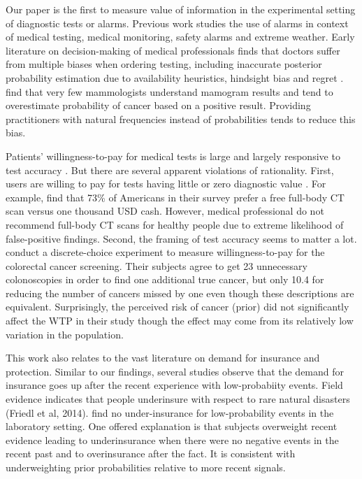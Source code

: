 \documentclass[12pt,a4paper]{article}
\begin{document}
Our paper is the first to measure value of information in the experimental setting of diagnostic tests or alarms. Previous work studies the use of alarms in context of medical testing, medical monitoring, safety alarms and extreme weather. Early literature on decision-making of medical professionals finds that doctors suffer from multiple biases when ordering testing, including  inaccurate posterior probability estimation due to availability heuristics, hindsight bias and regret \citep{bornstein_rationality_2001}. \citet{gigerenzer_helping_2007}find that very few mammologists understand mamogram results and tend to overestimate probability of cancer based on a positive result. Providing practitioners with natural frequencies instead of probabilities tends to reduce this bias.  

Patients' willingness-to-pay for medical tests is large and largely responsive to test accuracy \citep{liang_acceptability_2003, howard_does_2009, neumann_willingness--pay_2012}. But there are several apparent violations of rationality. First, users are willing to pay for tests having little or zero diagnostic value \citep{schwartz_enthusiasm_2004, neumann_willingness--pay_2012}. For example, \citet{schwartz_enthusiasm_2004} find that 73\% of Americans in their survey prefer a free full-body CT scan versus one thousand USD cash. However, medical professional do not recommend full-body CT scans for healthy people due to extreme likelihood of false-positive findings. Second, the framing of test accuracy seems to matter a lot. \citet{howard_does_2009} conduct a discrete-choice experiment to measure willingness-to-pay for the colorectal cancer screening. Their subjects agree to get 23 unnecessary colonoscopies in order to find one additional true cancer, but only 10.4 for reducing the number of cancers missed by one even though these descriptions are equivalent. Surprisingly, the perceived risk of cancer (prior) did not significantly affect the WTP in their study though the effect may come from its relatively low variation in the population.

This work also relates to the vast literature on demand for insurance and protection. Similar to our findings, several studies observe that the demand for insurance goes up after the recent experience with low-probabiity events. Field evidence indicates that people underinsure with respect to rare natural disasters (Friedl et al, 2014). \citet{laury_insurance_2009} find no under-insurance for low-probability events in the laboratory setting. One offered explanation \citep{volkman-wise_representativeness_2015} is that subjects overweight recent evidence leading to underinsurance when there were no negative events in the recent past and to overinsurance after the fact. It is consistent with underweighting prior probabilities relative to more recent signals. 
\end{document}
